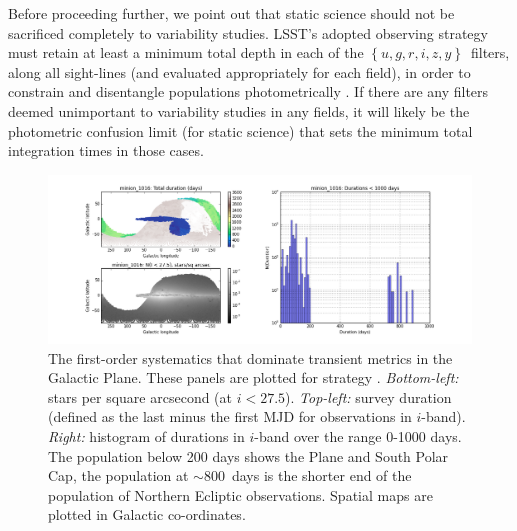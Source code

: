 Before proceeding further, we point out that static science should not
be sacrificed completely to variability studies. LSST's adopted
observing strategy must retain at least a minimum total depth in each
of the $\left\{u,g,r,i,z,y\right\}$~filters, along all sight-lines
(and evaluated appropriately for each field), in order to constrain
and disentangle populations photometrically
\citep[e.g.][]{2012ApJ...757..166B, ivezic08}. If there are any
filters deemed unimportant to variability studies in any fields, it
will likely be the photometric confusion limit (for static science)
that sets the minimum total integration times in those cases.


\begin{figure}
    \includegraphics[width=6.0in]{./figs/milkyway/durations_minion_1016.png}
  \caption{The first-order systematics that dominate transient metrics in the Galactic Plane. These panels are plotted for strategy . {\it Bottom-left:} stars per square arcsecond (at $i < 27.5$). {\it Top-left:} survey duration (defined as the last minus the first MJD for observations in $i$-band). {\it Right:} histogram of durations in $i$-band over the range 0-1000 days. The population below 200 days shows the Plane and South Polar Cap, the population at $\sim 800$~days is the shorter end of the population of Northern Ecliptic observations. Spatial maps are plotted in Galactic co-ordinates.}
\label{fig_durationInGalacticCoords}
\end{figure}


